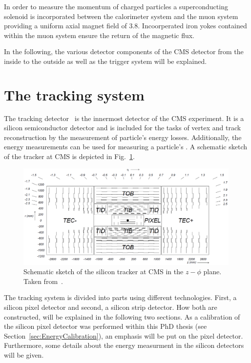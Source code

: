In order to measure the momentum of charged particles a superconducting solenoid is incorporated between the calorimeter system and the muon system providing a uniform axial magnet field of 3.8\tesla.
Incoorperated iron yokes contained within the muon system ensure the return of the magnetic flux. 

In the following, the various detector components of the CMS detector from the inside to the outside as well as the trigger system will be explained.
\FloatBarrier
\section{The tracking system}

The tracking detector~\cite{bib:CMS:Tracker_1997,bib:CMS:Tracker_2000} is the innermost detector of the CMS experiment. 
It is a silicon semiconductor detector and is included for the tasks of vertex and track reconstruction by the measurement of particle's energy losses.
Additionally, the energy measurements can be used for measuring a particle's \dedx.
A schematic sketch of the tracker at CMS is depicted in Fig.~\ref{fig:Tracker}.
\begin{figure}[!b]
  \centering
      \includegraphics[width=0.99\textwidth]{figures/experiment/CMS/Figures_Experimental_Apparatus_Tracker.png}
  \caption{Schematic sketch of the silicon tracker at CMS in the $z - \phi$ plane. Taken from~\cite{bib:CMS:tracking_8TeV}.}  
  \label{fig:Tracker}
\end{figure}
The tracking system is divided into parts using different technologies. First, a silicon pixel detector and second, a silicon strip detector.
How both are constructed, will be explained in the following two sections.
As a calibration of the silicon pixel detector was performed within this PhD thesis (see Section~\ref{sec:EnergyCalibration}), an emphasis will be put on the pixel detector.
Furthermore, some details about the energy measurment in the silicon detectors will be given.

